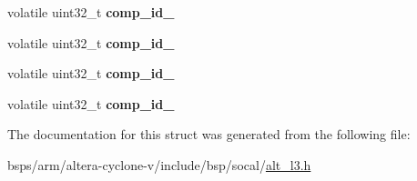 \begin{DoxyCompactItemize}
volatile uint32\+\_\+t {\bfseries comp\+\_\+id\+\_}
\item 
\mbox{\label{structALT__L3__IDGRP__raw__s_a2d304f123dfd1bc7ed0f731a4e0fa2b3}} 
volatile uint32\+\_\+t {\bfseries comp\+\_\+id\+\_}
\item 
\mbox{\label{structALT__L3__IDGRP__raw__s_accc87e59d72dca35aa11c7a9d38c2dc3}} 
volatile uint32\+\_\+t {\bfseries comp\+\_\+id\+\_}
\item 
\mbox{\label{structALT__L3__IDGRP__raw__s_a80f40d3cd260dcddaa9fccdf7210d1de}} 
volatile uint32\+\_\+t {\bfseries comp\+\_\+id\+\_}
\end{DoxyCompactItemize}


The documentation for this struct was generated from the following file\+:\begin{DoxyCompactItemize}
\item 
bsps/arm/altera-\/cyclone-\/v/include/bsp/socal/\mbox{\hyperlink{alt__l3_8h}{alt\+\_\+l3.\+h}}\end{DoxyCompactItemize}
